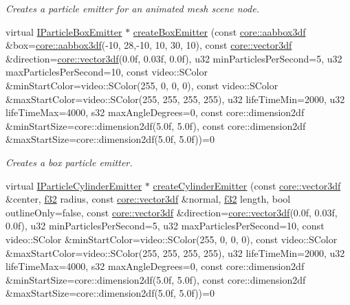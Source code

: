 \begin{DoxyCompactItemize}
\begin{DoxyCompactList}\small\item\em Creates a particle emitter for an animated mesh scene node. \end{DoxyCompactList}\item 
virtual \hyperlink{classirr_1_1scene_1_1IParticleBoxEmitter}{I\+Particle\+Box\+Emitter} $\ast$ \hyperlink{classirr_1_1scene_1_1IParticleSystemSceneNode_ae5f92fb41680b5da357c42cbb44e1675}{create\+Box\+Emitter} (const \hyperlink{namespaceirr_1_1core_adfc8fa01b30044c55f3332a1d6c1aa19}{core\+::aabbox3df} \&box=\hyperlink{namespaceirr_1_1core_adfc8fa01b30044c55f3332a1d6c1aa19}{core\+::aabbox3df}(-\/10, 28,-\/10, 10, 30, 10), const \hyperlink{namespaceirr_1_1core_a06f169d08b5c429f5575acb7edbad811}{core\+::vector3df} \&direction=\hyperlink{namespaceirr_1_1core_a06f169d08b5c429f5575acb7edbad811}{core\+::vector3df}(0.\+0f, 0.\+03f, 0.\+0f), u32 min\+Particles\+Per\+Second=5, u32 max\+Particles\+Per\+Second=10, const video\+::\+S\+Color \&min\+Start\+Color=video\+::\+S\+Color(255, 0, 0, 0), const video\+::\+S\+Color \&max\+Start\+Color=video\+::\+S\+Color(255, 255, 255, 255), u32 life\+Time\+Min=2000, u32 life\+Time\+Max=4000, s32 max\+Angle\+Degrees=0, const core\+::dimension2df \&min\+Start\+Size=core\+::dimension2df(5.\+0f, 5.\+0f), const core\+::dimension2df \&max\+Start\+Size=core\+::dimension2df(5.\+0f, 5.\+0f))=0
\begin{DoxyCompactList}\small\item\em Creates a box particle emitter. \end{DoxyCompactList}\item 
virtual \hyperlink{classirr_1_1scene_1_1IParticleCylinderEmitter}{I\+Particle\+Cylinder\+Emitter} $\ast$ \hyperlink{classirr_1_1scene_1_1IParticleSystemSceneNode_a191550f97d9f8a1ac7c6fefd78d84bf5}{create\+Cylinder\+Emitter} (const \hyperlink{namespaceirr_1_1core_a06f169d08b5c429f5575acb7edbad811}{core\+::vector3df} \&center, \hyperlink{namespaceirr_a0277be98d67dc26ff93b1a6a1d086b07}{f32} radius, const \hyperlink{namespaceirr_1_1core_a06f169d08b5c429f5575acb7edbad811}{core\+::vector3df} \&normal, \hyperlink{namespaceirr_a0277be98d67dc26ff93b1a6a1d086b07}{f32} length, bool outline\+Only=false, const \hyperlink{namespaceirr_1_1core_a06f169d08b5c429f5575acb7edbad811}{core\+::vector3df} \&direction=\hyperlink{namespaceirr_1_1core_a06f169d08b5c429f5575acb7edbad811}{core\+::vector3df}(0.\+0f, 0.\+03f, 0.\+0f), u32 min\+Particles\+Per\+Second=5, u32 max\+Particles\+Per\+Second=10, const video\+::\+S\+Color \&min\+Start\+Color=video\+::\+S\+Color(255, 0, 0, 0), const video\+::\+S\+Color \&max\+Start\+Color=video\+::\+S\+Color(255, 255, 255, 255), u32 life\+Time\+Min=2000, u32 life\+Time\+Max=4000, s32 max\+Angle\+Degrees=0, const core\+::dimension2df \&min\+Start\+Size=core\+::dimension2df(5.\+0f, 5.\+0f), const core\+::dimension2df \&max\+Start\+Size=core\+::dimension2df(5.\+0f, 5.\+0f))=0

\end{DoxyCompactItemize}
